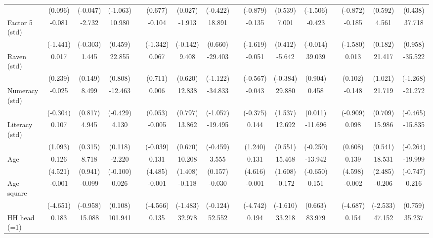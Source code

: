 {\begin{longtable}{@{\extracolsep{\fill}}lccccccccccccccc}
          & (0.096) & (-0.047) & (-1.063) &       & (0.677) & (0.027) & (-0.422) &       & (-0.879) & (0.539) & (-1.506) &       & (-0.872) & (0.592) & (0.438) \\
    Factor 5 (std) & -0.081 & -2.732 & 10.980 &       & -0.104 & -1.913 & 18.891 &       & -0.135 & 7.001 & -0.423 &       & -0.185 & 4.561 & 37.718 \\
          & (-1.441) & (-0.303) & (0.459) &       & (-1.342) & (-0.142) & (0.660) &       & (-1.619) & (0.412) & (-0.014) &       & (-1.580) & (0.182) & (0.958) \\
    Raven (std) & 0.017 & 1.445 & 22.855 &       & 0.067 & 9.408 & -29.403 &       & -0.051 & -5.642 & 39.039 &       & 0.013 & 21.417 & -35.522 \\
          & (0.239) & (0.149) & (0.808) &       & (0.711) & (0.620) & (-1.122) &       & (-0.567) & (-0.384) & (0.904) &       & (0.102) & (1.021) & (-1.268) \\
    Numeracy (std) & -0.025 & 8.499 & -12.463 &       & 0.006 & 12.838 & -34.833 &       & -0.043 & 29.880 & 0.458 &       & -0.148 & 21.719 & -21.272 \\
          & (-0.304) & (0.817) & (-0.429) &       & (0.053) & (0.797) & (-1.057) &       & (-0.375) & (1.537) & (0.011) &       & (-0.909) & (0.709) & (-0.465) \\
    Literacy (std) & 0.107 & 4.945 & 4.130 &       & -0.005 & 13.862 & -19.495 &       & 0.144 & 12.692 & -11.696 &       & 0.098 & 15.986 & -15.835 \\
          & (1.093) & (0.315) & (0.118) &       & (-0.039) & (0.670) & (-0.459) &       & (1.240) & (0.551) & (-0.250) &       & (0.608) & (0.541) & (-0.264) \\
    Age   & 0.126 & 8.718 & -2.220 &       & 0.131 & 10.208 & 3.555 &       & 0.131 & 15.468 & -13.942 &       & 0.139 & 18.531 & -19.999 \\
          & (4.521) & (0.941) & (-0.100) &       & (4.485) & (1.408) & (0.157) &       & (4.616) & (1.608) & (-0.650) &       & (4.598) & (2.485) & (-0.747) \\
    Age square & -0.001 & -0.099 & 0.026 &       & -0.001 & -0.118 & -0.030 &       & -0.001 & -0.172 & 0.151 &       & -0.002 & -0.206 & 0.216 \\
          & (-4.651) & (-0.958) & (0.108) &       & (-4.566) & (-1.483) & (-0.124) &       & (-4.742) & (-1.610) & (0.663) &       & (-4.687) & (-2.533) & (0.759) \\
    HH head (=1) & 0.183 & 15.088 & 101.941 &       & 0.135 & 32.978 & 52.552 &       & 0.194 & 33.218 & 83.979 &       & 0.154 & 47.152 & 35.237 \\

\end{longtable}}
